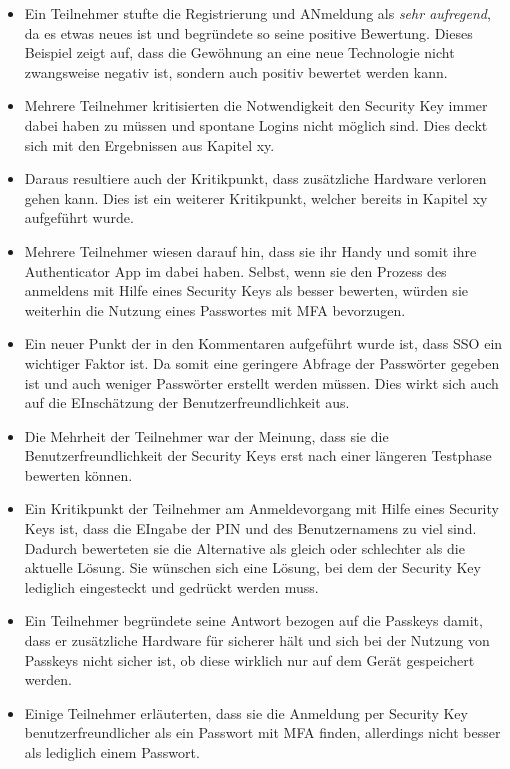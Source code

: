 \begin{itemize}
    \item Ein Teilnehmer stufte die Registrierung und ANmeldung als \glqq\textit{sehr aufregend}\grqq, da es etwas neues ist und begründete so seine positive Bewertung. Dieses Beispiel zeigt auf, dass die Gewöhnung an eine neue Technologie nicht zwangsweise negativ ist, sondern auch positiv bewertet werden kann.
    \item Mehrere Teilnehmer kritisierten die Notwendigkeit den Security Key immer dabei haben zu müssen und spontane Logins nicht möglich sind. Dies deckt sich mit den Ergebnissen aus Kapitel xy.
    \item Daraus resultiere auch der Kritikpunkt, dass zusätzliche Hardware verloren gehen kann. Dies ist ein weiterer Kritikpunkt, welcher bereits in Kapitel xy aufgeführt wurde.
    \item Mehrere Teilnehmer wiesen darauf hin, dass sie ihr Handy und somit ihre Authenticator App im dabei haben. Selbst, wenn sie den Prozess des anmeldens mit Hilfe eines Security Keys als besser bewerten, würden sie weiterhin die Nutzung eines Passwortes mit \ac{MFA} bevorzugen. 
    \item Ein neuer Punkt der in den Kommentaren aufgeführt wurde ist, dass \ac{SSO} ein wichtiger Faktor ist. Da somit eine geringere Abfrage der Passwörter gegeben ist und auch weniger Passwörter erstellt werden müssen. Dies wirkt sich auch auf die EInschätzung der Benutzerfreundlichkeit aus.
    \item Die Mehrheit der Teilnehmer war der Meinung, dass sie die Benutzerfreundlichkeit der Security Keys erst nach einer längeren Testphase bewerten können.
    \item Ein Kritikpunkt der Teilnehmer am Anmeldevorgang mit Hilfe eines Security Keys ist, dass die EIngabe der PIN und des Benutzernamens zu viel sind. Dadurch bewerteten sie die Alternative als gleich oder schlechter als die aktuelle Lösung. Sie wünschen sich eine Lösung, bei dem der Security Key lediglich eingesteckt und gedrückt werden muss.
    \item Ein Teilnehmer begründete seine Antwort bezogen auf die Passkeys damit, dass er zusätzliche Hardware für sicherer hält und sich bei der Nutzung von Passkeys nicht sicher ist, ob diese wirklich nur auf dem Gerät gespeichert werden.
    \item Einige Teilnehmer erläuterten, dass sie die Anmeldung per Security Key benutzerfreundlicher als ein Passwort mit \ac{MFA} finden, allerdings nicht besser als lediglich einem Passwort.

\end{itemize}

